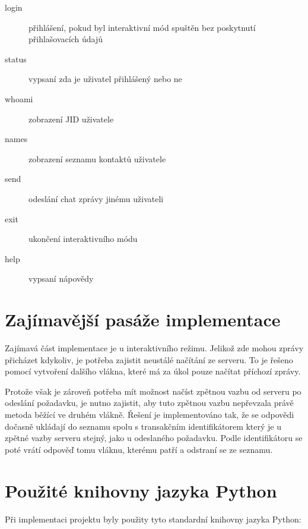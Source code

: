 \documentclass[11pt,a4paper]{article}
\begin{document}
      \begin{description}
        \item[login] přihlášení, pokud byl interaktivní mód spuštěn bez
                     poskytnutí přihlašovacích údajů
        \item[status] vypsaní zda je uživatel přihlášený nebo ne
        \item[whoami] zobrazení JID uživatele
        \item[names] zobrazení seznamu kontaktů uživatele
        \item[send] odeslání chat zprávy jinému uživateli
        \item[exit] ukončení interaktivního módu
        \item[help] vypsaní nápovědy
      \end{description}

  \section{Zajímavější pasáže implementace}

    Zajímavá část implementace je u interaktivního režimu. Jelikož zde mohou
    zprávy přicházet kdykoliv, je potřeba zajistit neustálé načítání ze
    serveru. To je řešeno pomocí vytvoření dalšího vlákna, které má za úkol
    pouze načítat příchozí zprávy.

    Protože však je zároveň potřeba mít
    možnost načíst zpětnou vazbu od serveru po odeslání požadavku, je nutno
    zajistit, aby tuto zpětnou vazbu nepřevzala právě metoda běžící ve
    druhém vlákně. Řešení je implementováno tak, že se odpovědi dočasně
    ukládají do seznamu spolu s transakčním identifikátorem který je u zpětné
    vazby serveru stejný, jako u odeslaného požadavku. Podle identifikátoru se
    poté vrátí odpověď tomu vláknu, kterému patří a odstraní se ze seznamu.

  \section{Použité knihovny jazyka Python}

    Při implementaci projektu byly použity tyto standardní knihovny jazyka
    Python:
\end{document}
